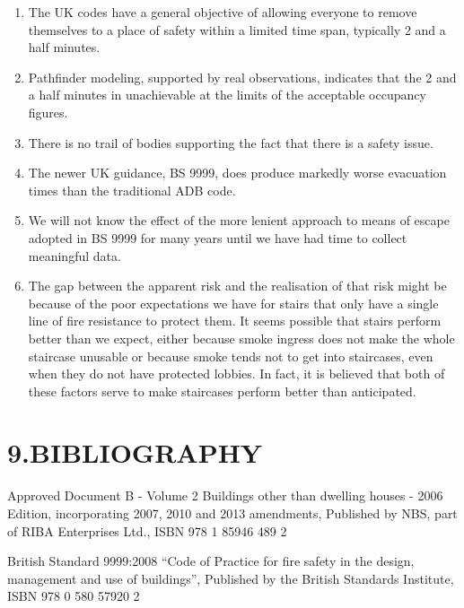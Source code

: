 \documentclass{style/llncs}
\begin{document}
\begin{enumerate}[noitemsep,topsep=\mdcompacttopsep]%

\item{}The UK codes have a general objective of allowing everyone to remove themselves to a place of safety within a limited time span, typically 2 and a half minutes.%

\item{}Pathfinder modeling, supported by real observations, indicates that the 2 and a half minutes in unachievable at the limits of the acceptable occupancy figures.%

\item{}There is no trail of bodies supporting the fact that there is a safety issue.%

\item{}The newer UK guidance, BS 9999, does produce markedly worse evacuation times than the traditional ADB code.%

\item{}We will not know the effect of the more lenient approach to means of escape adopted in BS 9999 for many years until we have had time to collect meaningful data.%

\item{}The gap between the apparent risk and the realisation of that risk might be because of the poor expectations we have for stairs that only have a single line of fire resistance to protect them.  It seems possible that stairs perform better than we expect, either because smoke ingress does not make the whole staircase unusable or because smoke tends not to get into staircases, even when they do not have protected lobbies.  In fact, it is believed that both of these factors serve to make staircases perform better than anticipated.%
\end{enumerate}%

\noindent{}\newpage{}%

\section{9.\hspace*{0.5em}BIBLIOGRAPHY}\label{sec-bibliography}%

\noindent{}Approved Document B - Volume 2 Buildings other than dwelling houses - 2006 Edition, incorporating 2007, 2010 and 2013 amendments, Published by NBS, part of RIBA Enterprises Ltd., ISBN 978 1 85946 489 2%

British Standard 9999:2008 \textquotedblleft{}Code of Practice for fire safety in the design, management and use of buildings\textquotedblright{}, Published by the British Standards Institute, ISBN 978 0 580 57920 2%
\end{document}

